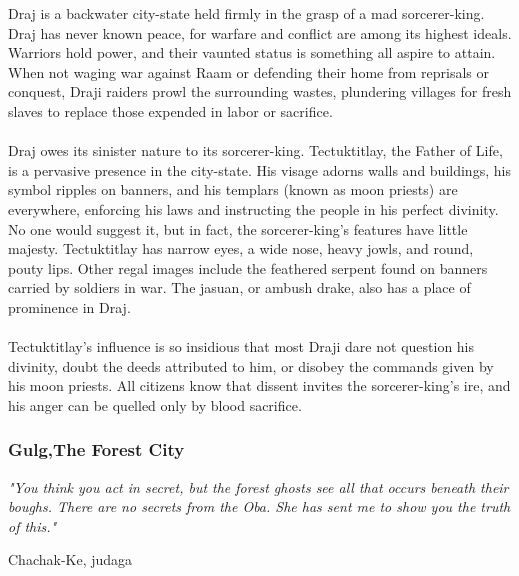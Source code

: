 \begin{multicols}{2}
Draj is a backwater city-state held firmly in the grasp
of a mad sorcerer-king. Draj has never known peace,
for warfare and conflict are among its highest ideals.
Warriors hold power, and their vaunted status is
something all aspire to attain. When not waging war
against Raam or defending their home from reprisals
or conquest, Draji raiders prowl the surrounding
wastes, plundering villages for fresh slaves to replace
those expended in labor or sacrifice.\\
\\
Draj owes its sinister nature to its sorcerer-king.
Tectuktitlay, the Father of Life, is a pervasive presence
in the city-state. His visage adorns walls and
buildings, his symbol ripples on banners, and his
templars (known as moon priests) are everywhere,
enforcing his laws and instructing the people in his
perfect divinity. No one would suggest it, but in fact,
the sorcerer-king’s features have little majesty.
Tectuktitlay has narrow eyes, a wide nose, heavy jowls,
and round, pouty lips. Other regal images include the
feathered serpent found on banners carried by soldiers
in war. The jasuan, or ambush drake, also has a
place of prominence in Draj.\\
\\
Tectuktitlay's influence is so insidious that most
Draji dare not question his divinity, doubt the deeds
attributed to him, or disobey the commands given
by his moon priests. All citizens know that dissent
invites the sorcerer-king's ire, and his anger can be
quelled only by blood sacrifice.\\

\subsubsection{Gulg,The Forest City}
\epigraph{\textit{
"You think you act in secret, but the forest ghosts see all that
occurs beneath their boughs. There are no secrets from the
Oba. She has sent me to show you the truth of this." }}
{ Chachak-Ke, judaga }


\end{multicols}
